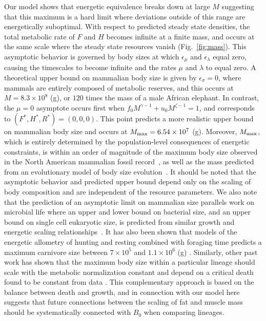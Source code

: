 \documentclass[twocolumn,preprintnumbers,amsmath,amssymb,superscriptaddress]{revtex4}
\begin{document}
Our model shows that energetic equivalence breaks down at large $M$ suggesting that this maximum is a hard limit where deviations outside of this range are energetically suboptimal.  
With respect to predicted steady state densities, the total metabolic rate of $F$ and $H$ becomes infinite at a finite mass, and occurs at the same scale where the steady state resources vanish (Fig.~\ref{fig:mass}). This asymptotic behavior is governed by body sizes at which $\epsilon_{\mu}$ and $\epsilon_{\lambda}$ equal zero, causing the timescales to become infinite and the rates $\mu$ and $\lambda$ to equal zero.
A theoretical upper bound on mammalian body size is given by $\epsilon_\sigma=0$, where mammals are entirely composed of metabolic reserves, and this occurs at $M=8.3\times 10^8$ (g), or $120$ times the mass of a male African elephant.
In contrast, the $\mu=0$ asymptote occurs first when $f_{0}M^{\gamma-1}+u_{0}M^{\zeta-1}=1$, and corresponds to $(F^*,H^*,R^*)=(0,0,0)$. 
This point predicts a more realistic upper bound on mammalian body size and occurs at $M_{\rm max}=6.54\times10^7$ (g).
Moreover, $M_{\rm max}$, which is entirely determined by the population-level consequences of energetic constraints, is within an order of magnitude of the maximum body size observed in the North American mammalian fossil record~\citep{Alroy:1998p1594}, as well as the mass predicted from an evolutionary model of body size evolution~\citep{Clauset:2009fh}.
It should be noted that the asymptotic behavior and predicted upper bound depend only on the scaling of body composition and are independent of the resource parameters.
We also note that the prediction of an asymptotic limit on mammalian size parallels work on microbial life where an upper and lower bound on bacterial size, and an upper bound on single cell eukaryotic size, is predicted from similar growth and energetic scaling relationships~\citep{Kempes:2012hy,Kempes:2016}. {\color{red} It has also been shown that models of the energetic allometry of hunting and resting combined with foraging time predicts a maximum carnivore size between $7\times10^{5}$ and $1.1\times10^{6}$ (g) \cite{Carbone:1999ju,carbone2007costs}. {\color{red} Similarly, other past work has shown that the maximum body size within a particular lineage should scale with the metabolic normalization constant and depend on a critical death found to be constant from data \cite{Okie:2013ju}. This complementary approach is based on the balance between death and growth, and in connection with our model here suggests that future connections between the scaling of fat and muscle mass should be systematically connected with $B_{0}$ when comparing lineages.}} %
\end{document}
